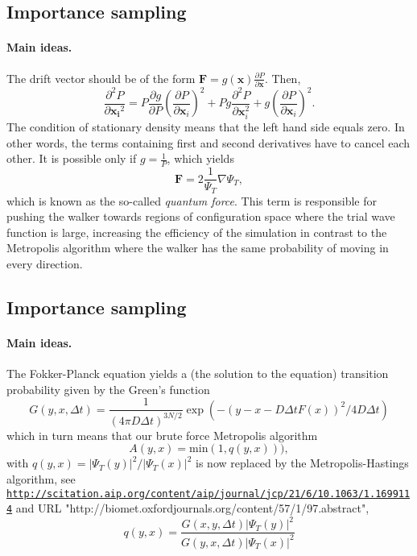 \documentclass[%
twoside,                 %
final,                   %
10pt]{article}
\begin{document}
\subsection{Importance sampling}

\paragraph{Main ideas.}
The drift vector should be of the form $\mathbf{F} = g(\mathbf{x}) \frac{\partial P}{\partial \mathbf{x}}$. Then,
\[
\frac{\partial^2 P}{\partial {\mathbf{x_i}^2}} = P\frac{\partial g}{\partial P}\left( \frac{\partial P}{\partial {\mathbf{x}_i}}  \right)^2 + P g \frac{\partial ^2 P}{\partial {\mathbf{x}_i^2}}  + g \left( \frac{\partial P}{\partial {\mathbf{x}_i}}  \right)^2.
\]
The condition of stationary density means that the left hand side equals zero. In other words, the terms containing first and second derivatives have to cancel each other. It is possible only if $g = \frac{1}{P}$, which yields
\begin{equation}
\boxed{\mathbf{F} = 2\frac{1}{\Psi_T}\nabla\Psi_T,}
\end{equation}
\label{quantumForceEQ}
which is known as the so-called \emph{quantum force}. This term is responsible for pushing the walker towards regions of configuration space where the trial wave function is large, increasing the efficiency of the simulation in contrast to the Metropolis algorithm where the walker has the same probability of moving in every direction.





\subsection{Importance sampling}

\paragraph{Main ideas.}
The Fokker-Planck equation yields a (the solution to the equation) transition probability given by the Green's function
\[
  G(y,x,\Delta t) = \frac{1}{(4\pi D\Delta t)^{3N/2}} \exp{\left(-(y-x-D\Delta t F(x))^2/4D\Delta t\right)}
\]
which in turn means that our brute force Metropolis algorithm
\[ 
    A(y,x) = \mathrm{min}(1,q(y,x))),
\]
with $q(y,x) = |\Psi_T(y)|^2/|\Psi_T(x)|^2$ is now replaced by the Metropolis-Hastings algorithm, see
\href{{http://scitation.aip.org/content/aip/journal/jcp/21/6/10.1063/1.1699114}}{\nolinkurl{http://scitation.aip.org/content/aip/journal/jcp/21/6/10.1063/1.1699114}} and URL "http://biomet.oxfordjournals.org/content/57/1/97.abstract", 
\[
q(y,x) = \frac{G(x,y,\Delta t)|\Psi_T(y)|^2}{G(y,x,\Delta t)|\Psi_T(x)|^2}
\]
\end{document}
